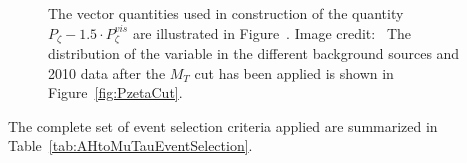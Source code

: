 \begin{figure}[t]
\begin{center}
   \caption[Reconstruction and distribution of \Pzeta
  discriminant]{The vector quantities used in construction of the quantity
  $P_{\zeta} - 1.5 \cdot P_{\zeta}^{vis}$ are illustrated in
  Figure~.  Image credit:~\cite{CDFrefPzeta}
  The distribution of the \Pzeta variable in the different background sources
  and 2010 data after the $M_T$ cut has been applied is shown in
  Figure~\ref{fig:PzetaCut}.}
  \label{fig:PzetaPlots}
\end{center}
\end{figure} 
The complete set of event selection criteria applied are summarized in
Table~\ref{tab:AHtoMuTauEventSelection}.

